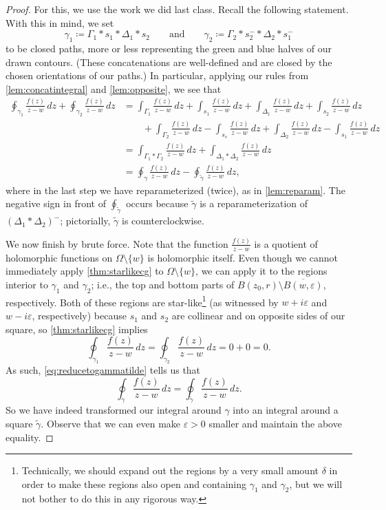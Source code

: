 \documentclass[../notes.tex]{subfiles}
\begin{document}
\begin{proof}
	For this, we use the work we did last class. Recall the following statement.
	\starlikecg*
	\noindent With this in mind, we set
	\[\gamma_1\coloneqq \Gamma_1*s_1*\Delta_1*s_2\qquad\text{and}\qquad\gamma_2\coloneqq \Gamma_2*s_2^-*\Delta_2*s_1^-\]
	to be closed paths, more or less representing the green and blue halves of our drawn contours. (These concatenations are well-defined and are closed by the chosen orientations of our paths.) In particular, applying our rules from \autoref{lem:concatintegral} and \autoref{lem:opposite}, we see that
	\begin{align*}
		\oint_{\gamma_1}\frac{f(z)}{z-w}\,dz+\oint_{\gamma_2}\frac{f(z)}{z-w}\,dz &= \int_{\Gamma_1}\frac{f(z)}{z-w}\,dz+\int_{s_1}\frac{f(z)}{z-w}\,dz+\int_{\Delta_1}\frac{f(z)}{z-w}\,dz+\int_{s_2}\frac{f(z)}{z-w}\,dz \\
		&\qquad +\int_{\Gamma_2}\frac{f(z)}{z-w}\,dz-\int_{s_s}\frac{f(z)}{z-w}\,dz+\int_{\Delta_2}\frac{f(z)}{z-w}\,dz-\int_{s_1}\frac{f(z)}{z-w}\,dz \\
		&= \int_{\Gamma_1*\Gamma_2}\frac{f(z)}{z-w}\,dz+\int_{\Delta_1*\Delta_2}\frac{f(z)}{z-w}\,dz \\
		&= \oint_{\gamma}\frac{f(z)}{z-w}\,dz-\oint_{\widetilde\gamma}\frac{f(z)}{z-w}\,dz, \tag{1}\label{eq:reducetogammatilde}
	\end{align*}
	where in the last step we have reparameterized (twice), as in \autoref{lem:reparam}. The negative sign in front of $\oint_{\widetilde\gamma}$ occurs because $\widetilde\gamma$ is a reparameterization of $(\Delta_1*\Delta_2)^-$; pictorially, $\widetilde\gamma$ is counterclockwise.

	We now finish by brute force. Note that the function $\frac{f(z)}{z-w}$ is a quotient of holomorphic functions on $\Omega\setminus\{w\}$ is holomorphic itself. Even though we cannot immediately apply \autoref{thm:starlikecg} to $\Omega\setminus\{w\}$, we can apply it to the regions interior to $\gamma_1$ and $\gamma_2$; i.e., the top and bottom parts of $B(z_0,r)\setminus\overline{B(w,\varepsilon)}$, respectively. Both of these regions are star-like\footnote{Technically, we should expand out the regions by a very small amount $\delta$ in order to make these regions also open and containing $\gamma_1$ and $\gamma_2$, but we will not bother to do this in any rigorous way.} (as witnessed by $w+i\varepsilon$ and $w-i\varepsilon$, respectively) because $s_1$ and $s_2$ are collinear and on opposite sides of our square, so \autoref{thm:starlikecg} implies
	\[\oint_{\gamma_1}\frac{f(z)}{z-w}\,dz=\oint_{\gamma_2}\frac{f(z)}{z-w}\,dz=0+0=0.\]
	As such, \autoref{eq:reducetogammatilde} tells us that
	\[\oint_\gamma\frac{f(z)}{z-w}\,dz=\oint_{\widetilde\gamma}\frac{f(z)}{z-w}\,dz.\]
	So we have indeed transformed our integral around $\gamma$ into an integral around a square $\widetilde\gamma$. Observe that we can even make $\varepsilon>0$ smaller and maintain the above equality.


\end{proof}
\end{document}
